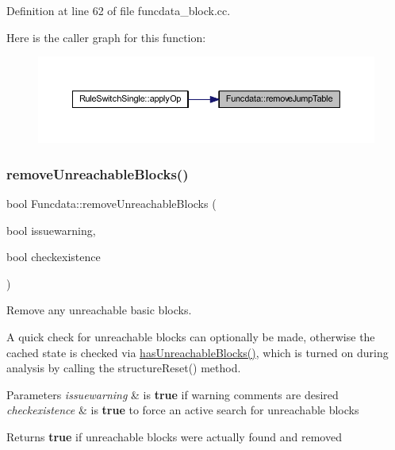 Definition at line 62 of file funcdata\+\_\+block.\+cc.

Here is the caller graph for this function\+:
\nopagebreak
\begin{figure}[H]
\begin{center}
\leavevmode
\includegraphics[width=350pt]{class_funcdata_a2e75df713649c7bba52b17b1b84bbcf6_icgraph}
\end{center}
\end{figure}
\mbox{\label{class_funcdata_a0fca3088c3d01a584aef0db49dfccc63}} 
\subsubsection{\texorpdfstring{removeUnreachableBlocks()}{removeUnreachableBlocks()}}
{\footnotesize\ttfamily bool Funcdata\+::remove\+Unreachable\+Blocks (\begin{DoxyParamCaption}\item[{bool}]{issuewarning,  }\item[{bool}]{checkexistence }\end{DoxyParamCaption})}



Remove any unreachable basic blocks. 

A quick check for unreachable blocks can optionally be made, otherwise the cached state is checked via \mbox{\hyperlink{class_funcdata_ae7daf83122a6a2ffff93774466baab26}{has\+Unreachable\+Blocks()}}, which is turned on during analysis by calling the structure\+Reset() method. 
\begin{DoxyParams}{Parameters}
{\em issuewarning} & is {\bfseries{true}} if warning comments are desired \\
\hline
{\em checkexistence} & is {\bfseries{true}} to force an active search for unreachable blocks \\
\hline
\end{DoxyParams}
\begin{DoxyReturn}{Returns}
{\bfseries{true}} if unreachable blocks were actually found and removed 
\end{DoxyReturn}



